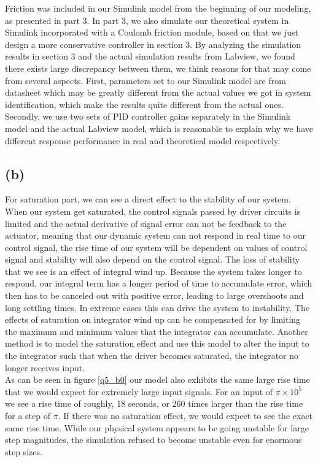 \documentclass[letterpaper]{article}
\begin{document}
Friction was included in our Simulink model from the beginning of our modeling, as presented in part 3. In part 3, we also simulate our theoretical system in Simulink incorporated with a Coulomb friction module, based on that we just design a more conservative controller in section 3. By analyzing the simulation results in section 3 and the actual simulation results from Labview, we found there exists large discrepancy between them, we think reasons for that may come from several aspects. First, parameters set to our Simulink model are from datasheet which may be greatly different from the actual values we got in system identification, which make the results quite different from the actual ones. Secondly, we use two sets of PID controller gains separately in the Simulink model and the actual Labview model, which is reasonable to explain why we have different response performance in real and theoretical model respectively. \\

\subsection*{(b)}
For saturation part, we can see a direct effect to the stability of our system.  When our system get saturated, the control signals passed by driver circuits is limited and the actual derivative of signal error can not be feedback to the actuator, meaning that our dynamic system can not respond in real time to our control signal, the rise time of our system will be dependent on values of control signal and stability will also depend on the control signal.  The loss of stability that we see is an effect of integral wind up.  Because the system takes longer to respond, our integral term has a longer period of time to accumulate error, which then has to be canceled out with positive error, leading to large overshoots and long settling times.  In extreme cases this can drive the system to instability.  The effects of saturation on integrator wind up can be compensated for by limiting the maximum and minimum values that the integrator can accumulate.  Another method is to model the saturation effect and use this model to alter the input to the integrator such that when the driver becomes saturated, the integrator no longer receives input. \\

As can be seen in figure \ref{q5_b0} our model also exhibits the same large rise time that we would expect for extremely large input signals.  For an input of $\pi \times 10^{5}$ we see a rise time of roughly, 18 seconds, or 260 times larger than the rise time for a step of $\pi$.  If there was no saturation effect, we would expect to see the exact same rise time.   While our physical system appears to be going unstable for large step magnitudes, the simulation refused to become unstable even for enormous step sizes.   
\end{document}

